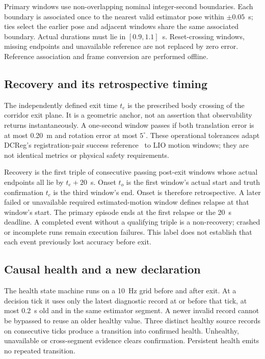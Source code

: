 \documentclass[11pt,a4paper]{article}
\begin{document}
Primary windows use non-overlapping nominal integer-second boundaries.
Each boundary is associated once to the nearest valid estimator pose within
$\pm0.05$~s; ties select the earlier pose and adjacent windows share the same
associated boundary. Actual durations must lie in $[0.9,1.1]$~s. Reset-crossing
windows, missing endpoints and unavailable reference are not replaced by
zero error. Reference association and frame conversion are performed offline.

\subsection{Recovery and its retrospective timing}
The independently defined exit time $t_e$ is the prescribed body crossing of
the corridor exit plane. It is a geometric anchor, not an assertion that
observability returns instantaneously. A one-second window passes if both
translation error is at most 0.20~m and rotation error at most $5^\circ$.
These operational tolerances adapt DCReg's registration-pair success
reference~\cite{dcreg} to LIO motion windows; they are not identical metrics
or physical safety requirements.

Recovery is the first triple of consecutive passing post-exit windows whose
actual endpoints all lie by $t_e+20$~s. Onset $t_o$ is the first window's
actual start and truth confirmation $t_c$ is the third window's end.
Onset is therefore retrospective. A later failed or unavailable required
estimated-motion window defines relapse at that window's start. The primary
episode ends at the first relapse or the 20~s deadline. A completed event
without a qualifying triple is a non-recovery; crashed or incomplete runs
remain execution failures. This label does not establish that each event
previously lost accuracy before exit.

\subsection{Causal health and a new declaration}
The health state machine runs on a 10~Hz grid before and after exit. At a
decision tick it uses only the latest diagnostic record at or before that
tick, at most 0.2~s old and in the same estimator segment. A newer invalid
record cannot be bypassed to reuse an older healthy value. Three distinct
healthy source records on consecutive ticks produce a transition into
confirmed health. Unhealthy, unavailable or cross-segment evidence clears
confirmation. Persistent health emits no repeated transition.
\end{document}
